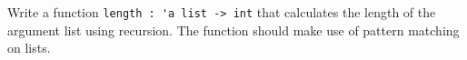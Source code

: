 Write a function \lstinline{length : 'a list -> int} that calculates
the length of the argument list using recursion. The function should
make use of pattern matching on lists.
